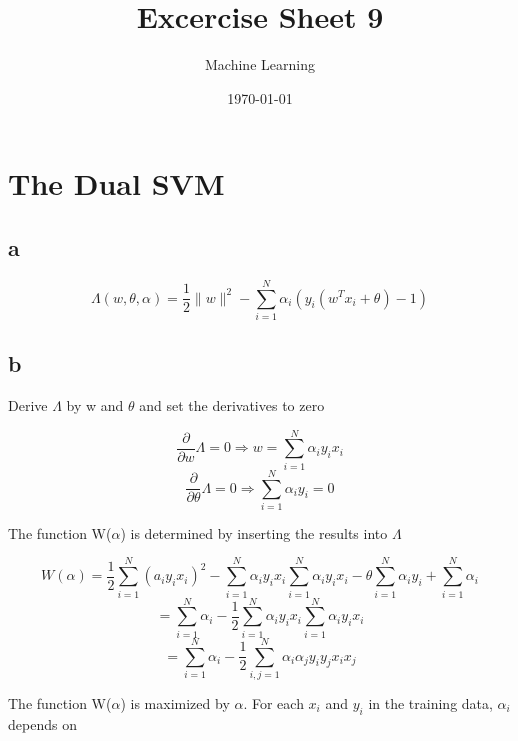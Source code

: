 \documentclass[11pt,abstract=on]{scrartcl}
\title{Excercise Sheet 9}
\subtitle{Machine Learning}
\date{\today}
\begin{document}
\maketitle
\section{The Dual SVM}
\subsection{a}
\begin{equation*}
\Lambda(w,\theta,\alpha) = \frac{1}{2}  \lVert w \rVert^2 - \sum\limits_{i=1}^{N} \alpha_{i}(y_{i}(w^T x_{i} + \theta)-1)
\end{equation*}

\subsection{b}
Derive $\Lambda$ by w and $\theta$ and set the derivatives to zero

\begin{equation*}
\frac{\partial}{\partial w} \Lambda = 0 \Rightarrow w = \sum\limits_{i=1}^{N}\alpha_i y_i x_i
\end{equation*}
\begin{equation*}
 \frac{\partial}{\partial \theta} \Lambda = 0 \Rightarrow \sum\limits_{i=1}^{N}\alpha_i y_i = 0
\end{equation*}

The function W($\alpha$) is determined by inserting the results into $\Lambda$

\begin{equation*}
W(\alpha) = \frac{1}{2}\sum\limits_{i=1}^{N}(a_i y_i x_i)^2 - \sum\limits_{i=1}^{N} \alpha_i y_i x_i \sum\limits_{i=1}^{N} \alpha_i y_i x_i - \theta \sum\limits_{i=1}^{N} \alpha_i y_i + \sum\limits_{i=1}^{N} \alpha_i
\end{equation*}
\begin{equation*}
= \sum\limits_{i=1}^{N} \alpha_i-\frac{1}{2} \sum\limits_{i=1}^{N} \alpha_i y_i x_i \sum\limits_{i=1}^{N} \alpha_i y_i x_i
\end{equation*}
\begin{equation*}
= \sum\limits_{i=1}^{N} \alpha_i-\frac{1}{2} \sum\limits_{i,j=1}^{N} \alpha_i \alpha_j y_i y_j x_i x_j
\end{equation*}

The function W($\alpha$) is maximized by $\alpha$. For each $x_i$ and $y_i$ in the training data, $\alpha_i$ depends on
\end{document}
